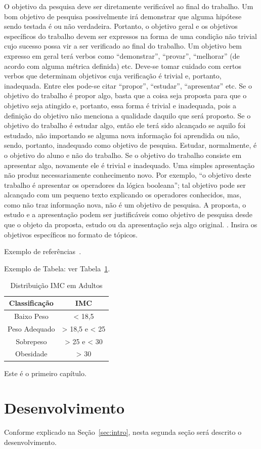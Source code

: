 O objetivo da pesquisa deve ser diretamente verificável ao final do trabalho. Um bom objetivo de pesquisa possivelmente irá demonstrar que alguma hipótese sendo testada é ou não verdadeira.
Portanto, o objetivo geral e os objetivos específicos do trabalho devem ser expressos na forma de uma condição não trivial cujo sucesso possa vir a ser verificado ao final do trabalho. Um objetivo bem expresso em geral terá verbos como “demonstrar”, “provar”, “melhorar” (de acordo com alguma métrica definida) etc.
Deve-se tomar cuidado com certos verbos que determinam objetivos cuja verificação é trivial e, portanto, inadequada. Entre eles pode-se citar “propor”, “estudar”, “apresentar” etc. Se o objetivo do trabalho é propor algo, basta que a coisa seja proposta para que o objetivo seja atingido e, portanto, essa forma é trivial e inadequada, pois a definição do objetivo não menciona a qualidade daquilo que será proposto.
Se o objetivo do trabalho é estudar algo, então ele terá sido alcançado se aquilo foi estudado, não importando se alguma nova informação foi aprendida ou não, sendo, portanto, inadequado como objetivo de pesquisa. Estudar, normalmente, é o objetivo do aluno e não do trabalho.
Se o objetivo do trabalho consiste em apresentar algo, novamente ele é trivial e inadequado. Uma simples apresentação não produz necessariamente conhecimento novo. Por exemplo, “o objetivo deste trabalho é apresentar os
operadores da lógica booleana”; tal objetivo pode ser alcançado com um pequeno texto explicando os operadores conhecidos, mas, como não traz informação nova, não é um objetivo de pesquisa.
A proposta, o estudo e a apresentação podem ser justificáveis como objetivo de pesquisa desde que o objeto da proposta, estudo ou da apresentação seja algo original.
\cite{wazlawick2009}.
Insira os objetivos específicos no formato de tópicos. 

Exemplo de refer\^encias~\cite{tese2011, confinter2011, confnac2011, rev2011, site2011}.

Exemplo de Tabela: ver Tabela~\ref{tab:exetab}.

\begin{table}[!ht]
\begin{center}
\caption{Distribuição IMC em Adultos}
\label{tab:exetab}
\begin{tabular}{|c |c |}
\hline
\textbf{\textbf{Classificação}} & \textbf{IMC}\\
\hline\hline
Baixo Peso & < 18,5 \\
Peso Adequado & > 18,5 e < 25 \\
Sobrepeso & > 25 e < 30 \\
Obesidade & > 30 \\
\hline
\end{tabular}
\end{center}
\end{table}

Este \'e o primeiro cap\'itulo. 
 


\section{Desenvolvimento}\label{sec:desenv}

Conforme explicado na Se\c{c}\~ao~\ref{sec:intro}, nesta segunda se\c{c}\~ao ser\'a descrito o desenvolvimento.
